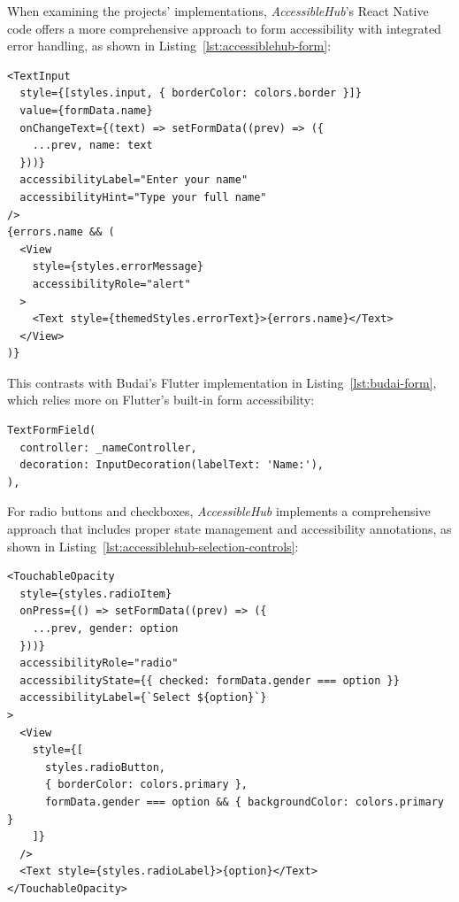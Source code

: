 \pagebreak

When examining the projects' implementations, \textit{AccessibleHub}'s React Native code offers a more comprehensive approach to form accessibility with integrated error handling, as shown in Listing~\ref{lst:accessiblehub-form}:

\begin{lstlisting}[style=ReactNativeStyle, caption=Form implementation in \textit{AccessibleHub}'s React Native code, label=lst:accessiblehub-form]
<TextInput
  style={[styles.input, { borderColor: colors.border }]}
  value={formData.name}
  onChangeText={(text) => setFormData((prev) => ({
    ...prev, name: text
  }))}
  accessibilityLabel="Enter your name"
  accessibilityHint="Type your full name"
/>
{errors.name && (
  <View 
    style={styles.errorMessage} 
    accessibilityRole="alert"
  >
    <Text style={themedStyles.errorText}>{errors.name}</Text>
  </View>
)}
\end{lstlisting}

\pagebreak

This contrasts with Budai's Flutter implementation in Listing~\ref{lst:budai-form}, which relies more on Flutter's built-in form accessibility:

\begin{lstlisting}[style=DartStyle, caption=Form implementation in Budai's Flutter code, label=lst:budai-form]
TextFormField(
  controller: _nameController,
  decoration: InputDecoration(labelText: 'Name:'),
),
\end{lstlisting}

For radio buttons and checkboxes, \textit{AccessibleHub} implements a comprehensive approach that includes proper state management and accessibility annotations, as shown in Listing~\ref{lst:accessiblehub-selection-controls}:

\begin{lstlisting}[style=ReactNativeStyle, caption=Selection controls in \textit{AccessibleHub}, label=lst:accessiblehub-selection-controls]
<TouchableOpacity
  style={styles.radioItem}
  onPress={() => setFormData((prev) => ({ 
    ...prev, gender: option 
  }))}
  accessibilityRole="radio"
  accessibilityState={{ checked: formData.gender === option }}
  accessibilityLabel={`Select ${option}`}
>
  <View
    style={[
      styles.radioButton,
      { borderColor: colors.primary },
      formData.gender === option && { backgroundColor: colors.primary }
    ]}
  />
  <Text style={styles.radioLabel}>{option}</Text>
</TouchableOpacity>
\end{lstlisting}

